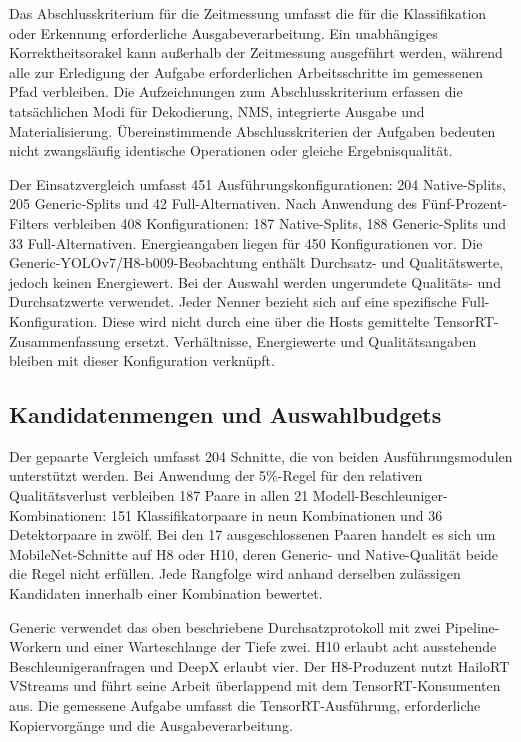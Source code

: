 Das Abschlusskriterium für die Zeitmessung umfasst die für die Klassifikation oder Erkennung erforderliche Ausgabeverarbeitung. Ein unabhängiges Korrektheitsorakel kann außerhalb der Zeitmessung ausgeführt werden, während alle zur Erledigung der Aufgabe erforderlichen Arbeitsschritte im gemessenen Pfad verbleiben. Die Aufzeichnungen zum Abschlusskriterium erfassen die tatsächlichen Modi für Dekodierung, NMS, integrierte Ausgabe und Materialisierung. Übereinstimmende Abschlusskriterien der Aufgaben bedeuten nicht zwangsläufig identische Operationen oder gleiche Ergebnisqualität.

Der Einsatzvergleich umfasst 451 Ausführungskonfigurationen: 204 Native-Splits, 205 Generic-Splits und 42 Full-Alternativen. Nach Anwendung des Fünf-Prozent-Filters verbleiben 408 Konfigurationen: 187 Native-Splits, 188 Generic-Splits und 33 Full-Alternativen. Energieangaben liegen für 450 Konfigurationen vor. Die Generic-YOLOv7/H8-b009-Beobachtung enthält Durchsatz- und Qualitätswerte, jedoch keinen Energiewert. Bei der Auswahl werden ungerundete Qualitäts- und Durchsatzwerte verwendet. Jeder Nenner bezieht sich auf eine spezifische Full-Konfiguration. Diese wird nicht durch eine über die Hosts gemittelte TensorRT-Zusammenfassung ersetzt. Verhältnisse, Energiewerte und Qualitätsangaben bleiben mit dieser Konfiguration verknüpft.

\subsection{Kandidatenmengen und Auswahlbudgets}
\label{app:current_selection_settings}

Der gepaarte Vergleich umfasst 204 Schnitte, die von beiden Ausführungsmodulen unterstützt werden. Bei Anwendung der 5\%-Regel für den relativen Qualitätsverlust verbleiben 187 Paare in allen 21 Modell-Beschleuniger-Kombinationen: 151 Klassifikatorpaare in neun Kombinationen und 36 Detektorpaare in zwölf. Bei den 17 ausgeschlossenen Paaren handelt es sich um MobileNet-Schnitte auf H8 oder H10, deren Generic- und Native-Qualität beide die Regel nicht erfüllen. Jede Rangfolge wird anhand derselben zulässigen Kandidaten innerhalb einer Kombination bewertet.

Generic verwendet das oben beschriebene Durchsatzprotokoll mit zwei Pipeline-Workern und einer Warteschlange der Tiefe zwei. H10 erlaubt acht ausstehende Beschleunigeranfragen und DeepX erlaubt vier. Der H8-Produzent nutzt HailoRT VStreams und führt seine Arbeit überlappend mit dem TensorRT-Konsumenten aus. Die gemessene Aufgabe umfasst die TensorRT-Ausführung, erforderliche Kopiervorgänge und die Ausgabeverarbeitung.

